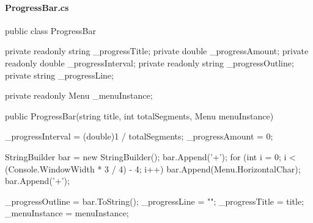 \begin{flushleft}
    
    \paragraph{ProgressBar.cs}
    \begin{cscode}
public class ProgressBar
{
    private readonly string _progressTitle;
    private double _progressAmount;
    private readonly double _progressInterval;
    private readonly string _progressOutline;
    private string _progressLine;

    private readonly Menu _menuInstance;

    public ProgressBar(string title, int totalSegments, Menu menuInstance)
    {
        _progressInterval = (double)1 / totalSegments;
        _progressAmount = 0;

        StringBuilder bar = new StringBuilder();
        bar.Append('+');
        for (int i = 0; i < (Console.WindowWidth * 3 / 4) - 4; i++) bar.Append(Menu.HorizontalChar);
        bar.Append('+');

        _progressOutline = bar.ToString();
        _progressLine = "";
        _progressTitle = title;
        _menuInstance = menuInstance;
    }

}
\end{cscode}
\end{flushleft}

